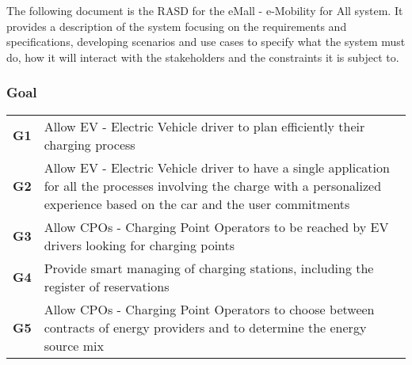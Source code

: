 The following document is the RASD for the eMall - e-Mobility for All system. It provides
a description of the system focusing on the requirements and specifications, developing scenarios and use cases
to specify what the system must do, how it will interact with the stakeholders and the constraints it is subject to.

\subsubsection{Goal}
\begin{table}[H]
    \begin{tabularx}{\textwidth}{cX}
        \toprule
        \textbf{G1} & Allow EV - Electric Vehicle driver to plan efficiently their charging process                   \\
        \textbf{G2} & Allow EV - Electric Vehicle driver to have a single application for all the processes involving
        the charge with a personalized experience based on the car and the user commitments                           \\
        \textbf{G3} & Allow CPOs - Charging Point Operators to be reached by EV drivers looking for charging points   \\
        \textbf{G4} & Provide smart managing of charging stations, including the register of reservations             \\
        \textbf{G5} & Allow CPOs - Charging Point Operators to choose between contracts of energy providers and
        to determine the energy source mix                                                                            \\ \bottomrule
    \end{tabularx}
\end{table}

